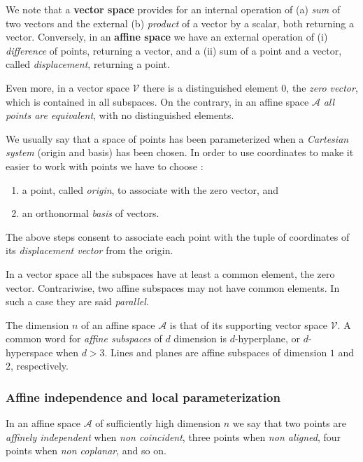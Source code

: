 We note that a \textbf{vector space} provides   for an internal operation of (a) \emph{sum} of two vectors and the external (b) \emph{product} of a vector by a scalar, both returning a vector. Conversely, in an \textbf{affine space} we have an external operation of (i) \emph{difference} of points, returning a vector, and  a (ii) sum of a point and a vector, called \emph{displacement}, returning a point.

Even more, in a vector space $\mathcal{V}$ there is a distinguished element $0$, the \emph{zero vector}, which is contained in all subspaces. On the contrary, in an affine space $\mathcal{A}$ \emph{all points are equivalent}, with no distinguished elements. 

We usually say that a space of points has been parameterized when a \emph{Cartesian system} (origin and basis) has been chosen.
In order to use coordinates to make it easier to work with points we have to choose :

\begin{enumerate}
\item 
a point, called \emph{origin}, to associate with the zero vector, and 
\item 
an orthonormal \emph{basis} of vectors. 
\end{enumerate}

The above steps consent to associate each point with the tuple of coordinates of its \emph{displacement vector} from the origin. 

In a vector space all the subspaces have at least a common element, the zero vector. Contrariwise, two affine subspaces may not have common elements. In such a case they are said \emph{parallel}. 

The dimension $n$ of an affine space $\mathcal{A}$ is that of its supporting vector space $\mathcal{V}$.
A common word for \emph{affine subspaces} of $d$ dimension is $d$-hyperplane, or $d$-hyperspace when $d>3$. Lines and planes are affine subspaces of dimension $1$ and $2$, respectively. 


\subsubsection*{Affine independence and local parameterization}
\label{sec:ccccccc}

In an affine space $\mathcal{A}$ of sufficiently high dimension $n$ we say that two points are \emph{affinely independent} when \emph{non coincident}, three points when \emph{non aligned}, four points when \emph{non coplanar}, and so on. 

